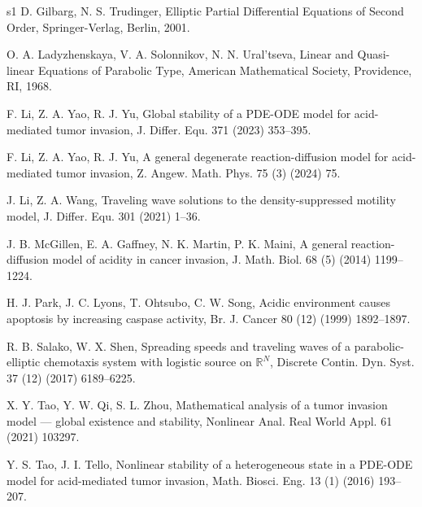 \documentclass[preprint,sort&compress,final,12pt]{elsarticle}
\numberwithin{equation}{section}
\begin{document}
\begin{thebibliography}{s1}
D. Gilbarg, N. S. Trudinger, Elliptic Partial Differential Equations of Second Order, Springer-Verlag, Berlin, 2001.

O. A. Ladyzhenskaya, V. A. Solonnikov, N. N. Ural'tseva, Linear and Quasi-linear Equations of Parabolic Type, American Mathematical Society, Providence, RI, 1968.

F. Li, Z. A. Yao, R. J. Yu, Global stability of a PDE-ODE model for acid-mediated tumor invasion, J. Differ. Equ. 371 (2023) 353--395.

F. Li, Z. A. Yao, R. J. Yu, A general degenerate reaction-diffusion model for acid-mediated tumor invasion, Z. Angew. Math. Phys. 75 (3) (2024) 75.

J. Li, Z. A. Wang, Traveling wave solutions to the density-suppressed motility model, J. Differ. Equ. 301 (2021) 1--36.

J. B. McGillen, E. A. Gaffney, N. K. Martin, P. K. Maini, A general reaction-diffusion model of acidity in cancer invasion, J. Math. Biol. 68 (5) (2014) 1199--1224.

H. J. Park, J. C. Lyons, T. Ohtsubo, C. W. Song, Acidic environment causes apoptosis by increasing caspase activity, Br. J. Cancer 80 (12) (1999) 1892--1897.

R. B. Salako, W. X. Shen, Spreading speeds and traveling waves of a parabolic-elliptic chemotaxis system with logistic source on $\mathbb{R}^N$, Discrete Contin. Dyn. Syst. 37 (12) (2017) 6189--6225.

X. Y. Tao, Y. W. Qi, S. L. Zhou, Mathematical analysis of a tumor invasion model --- global existence and stability, Nonlinear Anal. Real World Appl. 61 (2021) 103297.

Y. S. Tao, J. I. Tello, Nonlinear stability of a heterogeneous state in a PDE-ODE model for acid-mediated tumor invasion, Math. Biosci. Eng. 13 (1) (2016) 193--207.

\end{thebibliography}
\end{document}
